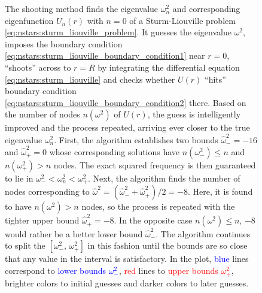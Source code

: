 \begin{figure}
\caption{\label{fig:nstars:shooting_convergence}%
	The shooting method finds the eigenvalue $\omega_n^2$ and corresponding eigenfunction $U_n(r)$ with $n=0$ of a Sturm-Liouville problem \eqref{eq:nstars:sturm_liouville_problem}.
	It guesses the eigenvalue $\omega^2$, imposes the boundary condition \eqref{eq:nstars:sturm_liouville_boundary_condition1} near $r = 0$, ``shoots'' across to $r=R$ by integrating the differential equation \eqref{eq:nstars:sturm_liouville} and checks whether $U(r)$ ``hits'' boundary condition \eqref{eq:nstars:sturm_liouville_boundary_condition2} there.
	Based on the number of nodes $n(\omega^2)$ of $U(r)$, the guess is intelligently improved and the process repeated, arriving ever closer to the true eigenvalue $\omega_n^2$.
	First, the algorithm establishes two bounds $\hat{\omega}_-^2 = -16$ and $\hat{\omega}_+^2 = 0$ whose corresponding solutions have $n(\omega_-^2) \leq n$ and $n(\omega_+^2) > n$ nodes.
	The exact squared frequency is then guaranteed to lie in $\omega_-^2 < \omega_n^2 < \omega_+^2$.
	Next, the algorithm finds the number of nodes corresponding to $\hat{\omega}^2 = (\hat{\omega}_-^2 + \hat{\omega}_+^2) / 2 = -8$.
	Here, it is found to have $n(\omega^2) > n$ nodes, so the process is repeated with the tighter upper bound $\hat{\omega}_+^2 = -8$.
	In the opposite case $n(\omega^2) \leq n$, $-8$ would rather be a better lower bound $\hat{\omega}_-^2$.
	The algorithm continues to split the $[\omega_-^2, \, \omega_+^2]$ in this fashion until the bounds are so close that any value in the interval is satisfactory.
	In the plot, \textcolor{blue}{blue} lines correspond to \textcolor{blue}{lower bounds $\omega_-^2$}, \textcolor{red}{red} lines to \textcolor{red}{upper bounds $\omega_+^2$}, brighter colors to initial guesses and darker colors to later guesses.
}
\end{figure}

